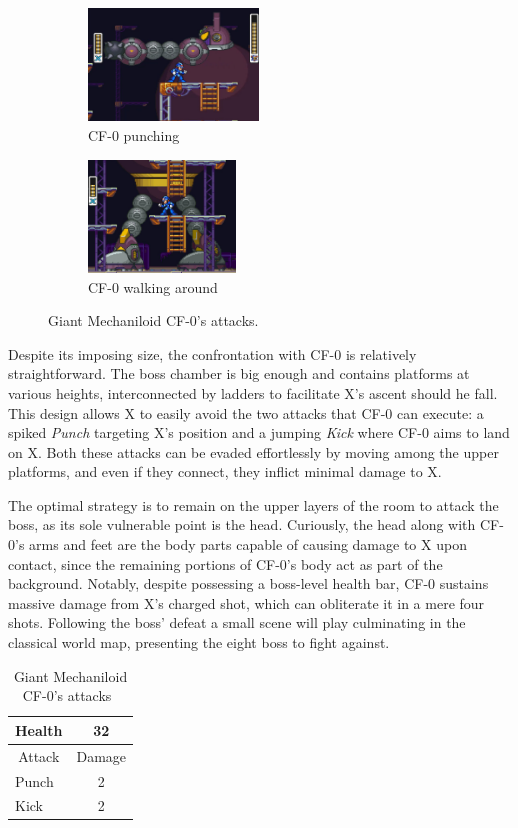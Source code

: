 \begin{figure}[htp]
	\centering
	\begin{subfigure}{0.4\linewidth}
		\centering
		\includegraphics[height=3cm]{figures/X2/cf_punch.jpg}
		\caption{CF-0 punching}
	\end{subfigure}
	\begin{subfigure}{0.4\linewidth}
		\centering
		\includegraphics[height=3cm]{figures/X2/cf_walk.jpg}
		\caption{CF-0 walking around}
	\end{subfigure}
	\caption{Giant Mechaniloid CF-0's attacks.}
\end{figure}
Despite its imposing size, the confrontation with CF-0 is relatively straightforward. The boss chamber is big enough and contains platforms at various heights, interconnected by ladders to facilitate X's ascent should he fall. This design allows X to easily avoid the two attacks that CF-0 can execute: a spiked \emph{Punch} targeting X's position and a jumping \emph{Kick} where CF-0 aims to land on X. Both these attacks can be evaded effortlessly by moving among the upper platforms, and even if they connect, they inflict minimal damage to X.

The optimal strategy is to remain on the upper layers of the room to attack the boss, as its sole vulnerable point is the head. Curiously, the head along with CF-0's arms and feet are the body parts capable of causing damage to X upon contact, since the remaining portions of CF-0's body act as part of the background. Notably, despite possessing a boss-level health bar, CF-0 sustains massive damage from X's charged shot, which can obliterate it in a mere four shots. Following the boss' defeat a small scene will play culminating in the classical world map, presenting the eight boss to fight against.

\begin{table}[htp]
	\centering
	\begin{tabular}[h]{l c}
		\toprule
		\multicolumn{1}{c}{Health}  & 32\\
		\midrule
		\multicolumn{1}{c}{Attack} & \multicolumn{1}{c}{Damage}\\
		Punch & 2 \\
		Kick & 2 \\
		\bottomrule
	\end{tabular}
	\caption{Giant Mechaniloid CF-0's attacks~\cite{wiki:CF-0,book:Compendium}}
\end{table}

